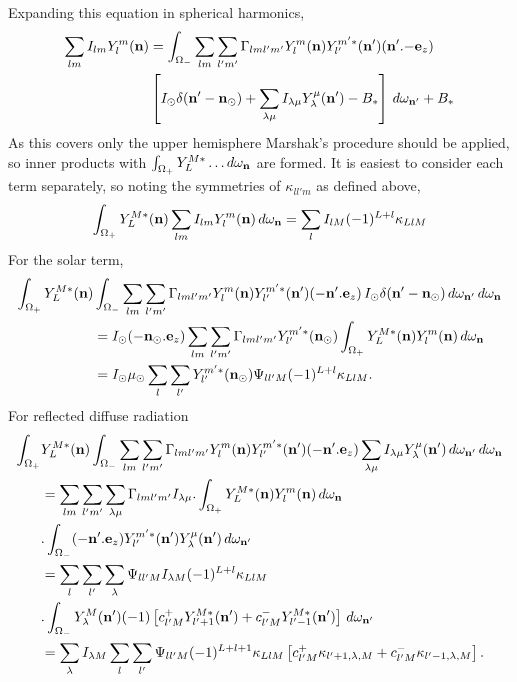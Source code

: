 Expanding this equation in spherical harmonics,
\begin{equation}
\begin{split}
\sum_{lm} I_{lm} Y_l^m (\mathbf{n}) &=\int_{\Omega_-} \sum_{lm} \sum_{l'm'} 
\Gamma_{lml'm'} Y_l^m (\mathbf{n}) Y_{l'}^{m'*} (\mathbf{n}') (\mathbf{n}' . {-\mathbf{e}}_z) \\
& \left [ I_\odot \delta (\mathbf{n}'-{\mathbf{n}}_\odot) +\sum_{\lambda\mu} 
I_{\lambda\mu} Y_\lambda^\mu (\mathbf{n}') -B_*
\right ] \, d \omega_{\mathbf{n}'} + B_*
\end{split}
\end{equation}
As this covers only the upper hemisphere Marshak's procedure should be
applied, so inner products with $\int_{\Omega_+} Y_L^{M*}
\ldots d\omega_{\mathbf{n}}$ are formed. It is easiest to consider each term 
separately, so noting the symmetries of $\kappa_{ll'm}$ as
defined above,
\begin{equation}
\int_{\Omega_+} Y_L^{M*} (\mathbf{n}) \sum_{lm} I_{lm} Y_l^m (\mathbf{n}) \, d\omega_{\mathbf{n}}
= \sum_l I_{lM} (-1)^{L+l} \kappa_{LlM}
\end{equation}
For the solar term,
\begin{equation}
\begin{split}
\int_{\Omega_+} Y_L^{M*} (\mathbf{n}) &\int_{\Omega_-} \sum_{lm} \sum_{l'm'}
\Gamma_{lml'm'} Y_l^m (\mathbf{n}) Y_{l'}^{m'*} (\mathbf{n}') (-\mathbf{n}'.\mathbf{e}_z) \,
I_{\odot} \delta (\mathbf{n}' - \mathbf{n}_{\odot} ) \, d\omega_{\mathbf{n}'} \, d\omega_{\mathbf{n}} \\
&= I_{\odot} (-\mathbf{n}_\odot.\mathbf{e}_z) \sum_{lm} \sum_{l'm'} \Gamma_{lml'm'}
Y_{l'}^{m'*} (\mathbf{n}_\odot) \int_{\Omega_+} Y_L^{M*} (\mathbf{n}) Y_l^m (\mathbf{n})
\, d\omega_{\mathbf{n}} \\
&= I_{\odot} \mu_\odot \sum_l \sum_{l'} Y_{l'}^{m'*} (\mathbf{n}_\odot) \Psi_{ll'M}
(-1)^{L+l} \kappa_{LlM}.
\end{split}
\end{equation}
For reflected diffuse radiation
{\small
\begin{equation}
\begin{split}
\int_{\Omega_+} & Y_L^{M*} (\mathbf{n}) \int_{\Omega_-} \sum_{lm} \sum_{l'm'}
\Gamma_{lml'm'} Y_l^m (\mathbf{n}) Y_{l'}^{m'*} (\mathbf{n}') (-\mathbf{n}'.\mathbf{e}_z)
\sum_{\lambda\mu} I_{\lambda\mu} Y_{\lambda}^{\mu} (\mathbf{n}') 
\, d\omega_{\mathbf{n}'} \, d\omega_{\mathbf{n}} \\
&= \sum_{lm} \sum_{l'm'} \sum_{\lambda\mu} \Gamma_{lml'm'} I_{\lambda\mu}
. \int_{\Omega_+} Y_L^{M*} (\mathbf{n}) Y_l^m (\mathbf{n}) \, d\omega_{\mathbf{n}} \\
& . \int_{\Omega_-} (-\mathbf{n}'.\mathbf{e}_z) Y_{l'}^{m'*} (\mathbf{n}') 
Y_{\lambda}^{\mu} (\mathbf{n}') \, d\omega_{\mathbf{n}'} \\
&= \sum_l \sum_{l'} \sum_\lambda \Psi_{ll'M} I_{\lambda M} (-1)^{L+l} 
\kappa_{LlM} \\
& . \int_{\Omega_-} Y_{\lambda}^{M} (\mathbf{n}') (-1) \left [
c_{l'M}^+ Y_{l'+1}^{M*} (\mathbf{n}') + c_{l'M}^- Y_{l'-1}^{M*} (\mathbf{n}') \right ]
\, d\omega_{\mathbf{n}'} \\
&=\sum_\lambda I_{\lambda M} \sum_l \sum_{l'} \Psi_{ll'M} (-1)^{L+l+1}
\kappa_{LlM} \left [ c_{l'M}^+ \kappa_{l'+1, \lambda, M} + c_{l'M}^-
\kappa_{l'-1, \lambda, M} \right ] .
\end{split}
\end{equation}
}
